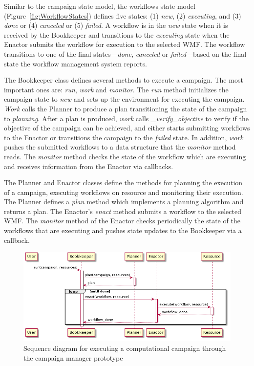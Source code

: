 Similar to the campaign state model, the workflows state model
(Figure~\ref{fig:WorkflowStates}) defines five states: (1) \textit{new}, (2)
\textit{executing}, and (3) \textit{done} or (4) \textit{canceled} or (5)
\textit{failed}. A workflow is in the \textit{new} state when it is received by
the Bookkeeper and transitions to the \textit{executing} state when the Enactor
submits the workflow for execution to the selected WMF. The workflow transitions
to one of the final states---\textit{done}, \textit{canceled} or
\textit{failed}---based on the final state the workflow management system
reports.

The Bookkeeper class defines several methods to execute a campaign. The most
important ones are: \textit{run}, \textit{work} and \textit{monitor}. The
\textit{run} method initializes the campaign state to \textit{new} and sets up
the environment for executing the campaign. \textit{Work} calls the Planner to
produce a plan transitioning the state of the campaign to \textit{planning}.
After a plan is produced, \textit{work} calls \textit{\_verify\_objective} to
verify if the objective of the campaign can be achieved, and either starts
submitting workflows to the Enactor or transitions the campaign to the
\textit{failed} state. In addition, \textit{work} pushes the submitted workflows
to a data structure that the \textit{monitor} method reads. The \textit{monitor}
method checks the state of the workflow which are executing and receives
information from the Enactor via callbacks.

The Planner and Enactor classes define the methods for planning the execution
of a campaign, executing workflows on resource and monitoring their execution.
The Planner defines a \textit{plan} method which implements a planning
algorithm and returns a plan. The Enactor's \textit{enact} method submits a
workflow to the selected WMF. The \textit{monitor} method of the Enactor
checks periodically the state of the workflows that are executing and pushes
state updates to the Bookkeeper via a callback.

\begin{figure}[t]
    \centering
    \includegraphics[width=.85\textwidth]{figures/manager/rcm_seq.png}
    \caption{Sequence diagram for executing a computational campaign through the campaign manager prototype}
    \label{fig:seq_diag}
\end{figure}

